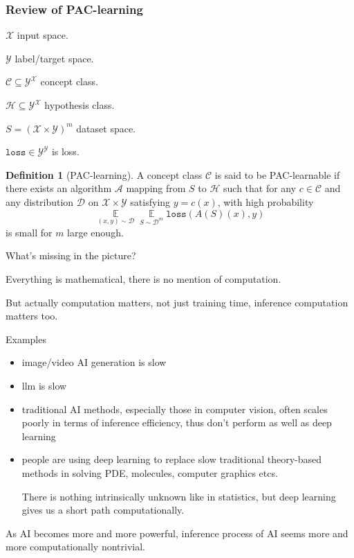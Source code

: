 \documentclass{beamer}   	%
\theoremstyle{definition}
\newtheorem*{defn}{Definition}
\newcommand{\rust}[1]{\texttt{#1}}
\newcommand{\expect}{\mathop{\mathbb{E}}}
\begin{document}
\begin{frame}
\frametitle{Review of PAC-learning}
$\mathcal{X}$ input space.

$\mathcal{Y}$ label/target space.

$\mathcal{C}\subseteq \mathcal{Y}^\mathcal{X}$ concept class.

$\mathcal{H}\subseteq \mathcal{Y}^\mathcal{X}$ hypothesis class.

$S=(\mathcal{X}\times \mathcal{Y})^m$ dataset space.

$\rust{loss}\in \mathcal{Y}^\mathcal{Y}$ is loss.

\begin{defn}[PAC-learning]
A concept class $\mathcal{C}$ is said to be PAC-learnable if there exists an algorithm $\mathcal{A}$ mapping from $S$ to $\mathcal{H}$ such that for any $c\in \mathcal{C}$ and any distribution $\mathcal{D}$ on $\mathcal{X}\times\mathcal{Y}$ satisfying $y=c(x)$, with high probability
\begin{equation}
	\expect\limits_{(x,y)\sim \mathcal{D}}\expect\limits_{S\sim \mathcal{D}^m}\rust{loss}(A(S)(x),y)
\end{equation}
is small for $m$ large enough.
\end{defn}
\end{frame}

\begin{frame}
What's missing in the picture?

\mbox{}

Everything is mathematical, there is no mention of computation.

\mbox{}

But actually computation matters, not just training time, inference computation matters too.
\end{frame}

\begin{frame}
Examples
\begin{itemize}
	\item image/video AI generation is slow
	\item llm is slow
	\item traditional AI methods, especially those in computer vision, often scales poorly in terms of inference efficiency, thus don't perform as well as deep learning
	\item people are using deep learning to replace slow traditional theory-based methods in solving PDE, molecules, computer graphics etcs.

	There is nothing intrinsically unknown like in statistics, but deep learning gives us a short path computationally.
\end{itemize}

As AI becomes more and more powerful, inference process of AI seems more and more computationally nontrivial.
\end{frame}
\end{document}
